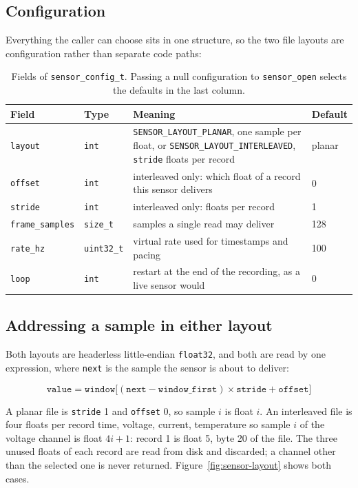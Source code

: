 \documentclass[12pt,a4paper,oneside]{report}
\begin{document}
\subsection{Configuration}

Everything the caller can choose sits in one structure, so the two file layouts
are configuration rather than separate code paths:

\begin{table}[htbp]
\centering
\caption{Fields of \texttt{sensor\_config\_t}. Passing a null configuration to
\texttt{sensor\_open} selects the defaults in the last column.}
\label{tab:sensor-config}
\begin{tabular}{@{}llp{6.2cm}l@{}}
\hline
Field & Type & Meaning & Default \\
\hline
\texttt{layout} & \texttt{int} & \texttt{SENSOR\_LAYOUT\_PLANAR}, one sample per float, or \texttt{SENSOR\_LAYOUT\_INTERLEAVED}, \texttt{stride} floats per record & planar \\
\texttt{offset} & \texttt{int} & interleaved only: which float of a record this sensor delivers & 0 \\
\texttt{stride} & \texttt{int} & interleaved only: floats per record & 1 \\
\texttt{frame\_samples} & \texttt{size\_t} & samples a single read may deliver & 128 \\
\texttt{rate\_hz} & \texttt{uint32\_t} & virtual rate used for timestamps and pacing & 100 \\
\texttt{loop} & \texttt{int} & restart at the end of the recording, as a live sensor would & 0 \\
\hline
\end{tabular}
\end{table}

\subsection{Addressing a sample in either layout}

Both layouts are headerless little-endian \texttt{float32}, and both are read by
one expression, where \texttt{next} is the sample the sensor is about to deliver:

\begin{equation}
  \texttt{value} = \texttt{window}\bigl[(\texttt{next} - \texttt{window\_first})
  \times \texttt{stride} + \texttt{offset}\bigr]
  \label{eq:sensor-address}
\end{equation}

A planar file is \texttt{stride} 1 and \texttt{offset} 0, so sample $i$ is float
$i$. An interleaved file is four floats per record  time, voltage, current,
temperature  so sample $i$ of the voltage channel is float $4i + 1$: record 1
is float 5, byte 20 of the file. The three unused floats of each record are read
from disk and discarded; a channel other than the selected one is never returned.
Figure~\ref{fig:sensor-layout} shows both cases.
\end{document}
